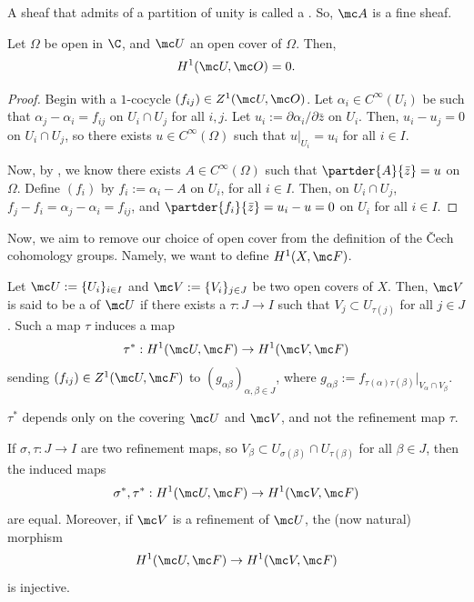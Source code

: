 \documentclass[11pt]{report}
\begin{document}
\begin{defn}
A sheaf that admits of a partition of unity is called a . So, $\mc A$ is a fine sheaf.
\end{defn}


\begin{thm}
    Let $\Omega$ be open in $\C$, and $\mc U$ an open cover of $\Omega$. Then,
    \[
    H^1(\mc U,\mc O)=0.
    \]
\end{thm}

\begin{proof}

Begin with a $1$-cocycle $(f_{ij})\in Z^1(\mc U,\mc O)$. Let $\alpha _i \in C^\infty (U_i)$ be such that $\alpha_j - \alpha _i = f_{ij}$ on $U_i \cap U_j$ for all $i,j$. Let $u_i := \partial \alpha _i / \partial \bar z$ on $U_i$. Then, $u_i - u_j=0$ on $U_i \cap U_j$, so there exists $u \in C^\infty (\Omega)$ such that $u|_{U_i}=u_i$ for all $i \in I$.

Now, by , we know there exists $A \in C^\infty (\Omega)$ such that $\partder{A}{\bar z}=u$ on $\Omega$. Define $(f_i)$ by $f_i := \alpha _i - A$ on $U_i$, for all $i \in I$. Then, on $U_i \cap U_j$, $f_j -f_i = \alpha _j -\alpha _i = f_{ij}$, and $\partder{f_i}{\bar z}=u_i-u=0$ on $U_i$ for all $i \in I$.
\end{proof}

Now, we aim to remove our choice of open cover from the definition of the \v{C}ech cohomology groups. Namely, we want to define $H^1(X, \mc F)$.

\begin{defn}
Let $\mc U:=\{U_i\}_{i \in I}$ and $\mc V:= \{V_i\}_{j \in J}$ be two open covers of $X$. Then, $\mc V$ is said to be a  of $\mc U$ if there exists a  $\tau :J \to I$ such that $V_j \subset U_{\tau(j)}$ for all $j \in J$. Such a map $\tau$ induces a map
\[
\tau^* : H^1 (\mc U,\mc F) \to H^1 (\mc V,\mc F)
\]
sending $(f_{ij})\in Z^1(\mc U,\mc F)$ to $(g_{\alpha\beta})_{\alpha,\beta \in J}$, where $g_{\alpha \beta}:= f_{\tau(\alpha) \tau (\beta)}|_{V_\alpha \cap V_\beta}$.
\end{defn}

\begin{notethm*}[Check]
    $\tau^*$ depends only on the covering $\mc U$ and $\mc V$, and not the refinement map $\tau$.
\end{notethm*}

\begin{lem}
    If $\sigma,\tau : J \to I$ are two refinement maps, so $V_\beta \subset U_{\sigma(\beta)} \cap U_{\tau (\beta)}$ for all $\beta \in J$, then the induced maps
    \[
    \sigma^*,\tau^* : H^1(\mc U,\mc F) \to H^1(\mc V, \mc F)
    \]
    are equal. Moreover, if $\mc V$ is a refinement of $\mc U$, the (now natural) morphism
    \[
    H^1(\mc U,\mc F) \to H^1(\mc V ,\mc F)
    \]
    is injective.
\end{lem}
\end{document}
